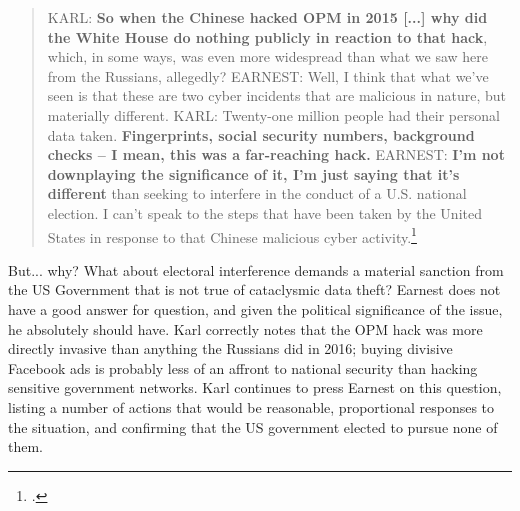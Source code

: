 \documentclass{memoir}
\begin{document}
\begin{refsegment}
\begin{quote}
KARL: \textbf{So when the Chinese hacked OPM in 2015 [...] why did the White House do nothing publicly in reaction to that hack}, which, in some ways, was even more widespread than what we saw here from the Russians, allegedly?
\newline \newline
EARNEST: Well, I think that what we've seen is that these are two cyber incidents that are malicious in nature, but materially different.
\newline \newline
KARL: Twenty-one million people had their personal data taken.  \textbf{Fingerprints, social security numbers, background checks -- I mean, this was a far-reaching hack.}
\newline \newline
EARNEST: \textbf{I'm not downplaying the significance of it, I'm just saying that it's different} than seeking to interfere in the conduct of a U.S. national election. I can't speak to the steps that have been taken by the United States in response to that Chinese malicious cyber activity.\footcite[Transcript adapted from the official White House website.]{earnest_press_2017}
\end{quote}

But... why? What about electoral interference demands a material sanction from the US Government that is not true of cataclysmic data theft? Earnest does not have a good answer for question, and given the political significance of the issue, he absolutely should have. Karl correctly notes that the OPM hack was more directly invasive than anything the Russians did in 2016; buying divisive Facebook ads is probably less of an affront to national security than hacking sensitive government networks. Karl continues to press Earnest on this question, listing a number of actions that would be reasonable, proportional responses to the situation, and confirming that the US government elected to pursue none of them.


\end{refsegment}
\end{document}

